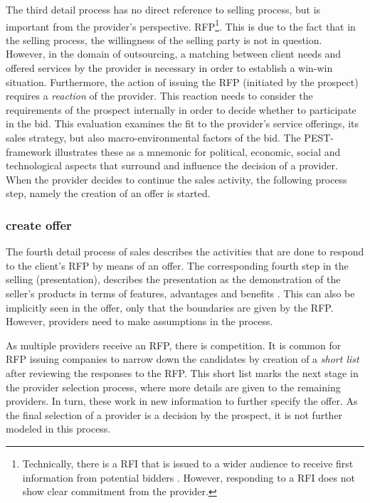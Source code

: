 	The third detail process has no direct reference to selling process, but is important from the provider's perspective. \acrshort{RFP}\footnote{Technically, there is a \acrfull{RFI} that is issued to a wider audience to receive first  information from potential bidders \citep{bitkom2008}. However, responding to a \acrshort{RFI} does not show clear commitment from the provider.}. This is due to the fact that in the selling process, the willingness of the selling party is not in question. However, in the domain of outsourcing, a matching between client needs and offered services by the provider is necessary in order to establish a win-win situation. Furthermore, the action of issuing the \acrshort{RFP} (initiated by the prospect) requires a \textit{reaction} of the provider. This reaction needs to consider the requirements of the prospect internally in order to decide whether to participate in the bid. This evaluation examines the fit to the provider's service offerings, its sales strategy, but also macro-environmental factors of the bid. The PEST-framework \citep{0314852336} illustrates these as a mnemonic for political, economic, social and technological aspects that surround and influence the decision of a provider. 
	When the provider decides to continue the sales activity, the following process step, namely the creation of an offer is started. 
	
	\subsubsection{create offer}
	The fourth detail process of sales describes the activities that are done to respond  to the client's \acrshort{RFP} by means of an offer. The corresponding fourth step in the selling (presentation), describes the presentation as the demonstration of the seller's products in terms of features, advantages and benefits \citep{Moncrief_2005}. This can also be implicitly seen in the offer, only that the boundaries are given by the \acrshort{RFP}. However, providers need to make assumptions in the process. 
	
	As multiple providers receive an \acrshort{RFP}, there is competition. It is common for \acrshort{RFP} issuing companies to narrow down the candidates by creation of a \textit{short list} after reviewing the responses to the \acrshort{RFP}. This short list marks the next stage in the provider selection process, where more details are given to the remaining providers. In turn, these work in new information to further specify the offer. As the final selection of a provider is a decision by the prospect, it is not further modeled in this process. 
	
